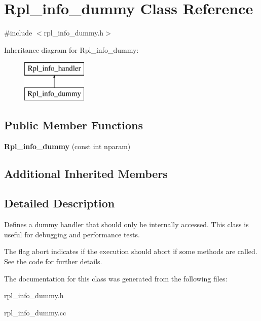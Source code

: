 \hypertarget{classRpl__info__dummy}{}\section{Rpl\+\_\+info\+\_\+dummy Class Reference}
\label{classRpl__info__dummy}


{\ttfamily \#include $<$rpl\+\_\+info\+\_\+dummy.\+h$>$}

Inheritance diagram for Rpl\+\_\+info\+\_\+dummy\+:\begin{figure}[H]
\begin{center}
\leavevmode
\includegraphics[height=2.000000cm]{classRpl__info__dummy}
\end{center}
\end{figure}
\subsection*{Public Member Functions}
\begin{DoxyCompactItemize}
\item 
\mbox{\label{classRpl__info__dummy_a7140e292c9138108b530bdd06ebd3ef3}} 
{\bfseries Rpl\+\_\+info\+\_\+dummy} (const int nparam)
\end{DoxyCompactItemize}
\subsection*{Additional Inherited Members}


\subsection{Detailed Description}
Defines a dummy handler that should only be internally accessed. This class is useful for debugging and performance tests.

The flag abort indicates if the execution should abort if some methods are called. See the code for further details. 

The documentation for this class was generated from the following files\+:\begin{DoxyCompactItemize}
\item 
rpl\+\_\+info\+\_\+dummy.\+h\item 
rpl\+\_\+info\+\_\+dummy.\+cc\end{DoxyCompactItemize}
